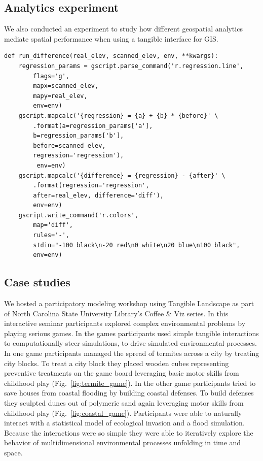 \documentclass[prodmode,acmtochi]{acmsmall} %
\begin{document}



\subsection{Analytics experiment}
We also conducted an experiment to study how different geospatial analytics mediate spatial performance when using a tangible interface for GIS.



\begin{verbatim}
def run_difference(real_elev, scanned_elev, env, **kwargs):
	regression_params = gscript.parse_command('r.regression.line', 
		flags='g',
		mapx=scanned_elev,
		mapy=real_elev,
		env=env)
	gscript.mapcalc('{regression} = {a} + {b} * {before}' \
		.format(a=regression_params['a'],
		b=regression_params['b'],
		before=scanned_elev,
		regression='regression'),
		 env=env)
	gscript.mapcalc('{difference} = {regression} - {after}' \
		.format(regression='regression',
		after=real_elev, difference='diff'),
		env=env)
	gscript.write_command('r.colors', 
		map='diff',
		rules='-',
		stdin="-100 black\n-20 red\n0 white\n20 blue\n100 black",
		env=env)
\end{verbatim}




\subsection{Case studies}

We hosted a participatory modeling workshop using Tangible Landscape 
as part of North Carolina State University Library's Coffee \& Viz series. 
%
In this interactive seminar participants 
explored complex environmental problems 
by playing serious games. 
%
In the games
participants used simple tangible interactions 
to computationally steer simulations, 
to drive simulated environmental processes. 
%
In one game participants managed the spread of termites across a city by treating city blocks. 
To treat a city block they placed wooden cubes representing preventive treatments on the game board 
leveraging basic motor skills from childhood play 
(Fig.~\ref{fig:termite_game}).
%
In the other game participants tried to save houses from coastal flooding by building coastal defenses. 
To build defenses they sculpted dunes out of polymeric sand
again leveraging motor skills from childhood play
(Fig.~\ref{fig:coastal_game}). 
%
Participants were able to naturally 
interact with a statistical model of ecological invasion
and a flood simulation. 
Because the interactions were so simple %
they were able to iteratively 
explore the behavior of multidimensional environmental processes
unfolding in time and space. 
\end{document}
